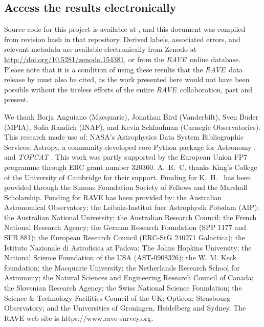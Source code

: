 \documentclass[preprint]{aastex}
\newcommand{\acronym}[1]{{\small{#1}}}
\newcommand{\project}[1]{\textsl{#1}}
\newcommand{\rave}{\project{\acronym{RAVE}}}
\begin{document}
\subsection*{Access the results electronically}

\noindent{}Source code for this project is available at \texttt{\giturl}\hspace{-0.5em},
and this document was compiled from revision hash \texttt{\githash} in that repository.
Derived labels, associated errors, and relevant metadata are available electronically
from Zenodo \citep{Zenodo} at \url{http://doi.org/10.5281/zenodo.154381}, or 
from the \rave\ online database. Please note that it is a 
condition of using these results that the \rave\ data release by \citet{Kunder_2016} 
must also be cited, as the work presented here would not have been possible without the 
tireless efforts of the entire \rave\ collaboration, past and present.


\acknowledgements
We thank 
	Borja Anguiano (Macquarie),
	Jonathan Bird (Vanderbilt),
	Sven Buder (MPIA), 
	Sofia Randich (INAF),
and
	Kevin Schlaufman (Carnegie Observatories).
This research made use of: 
  	NASA's Astrophysics Data System Bibliographic Services;
  	Astropy, a community-developed core Python package for Astronomy \citep{astropy};
and 
  	\project{TOPCAT} \citep{Taylor_2005}.
This work was partly supported by the European Union FP7 programme through ERC 
grant number 320360. A.~R.~C. thanks King's College of the University of Cambridge
for their support.  Funding for K.~H.~ has been provided through the Simons 
Foundation Society of Fellows and the Marshall Scholarship.
Funding for RAVE has been provided by: the Australian Astronomical Observatory; 
the Leibniz-Institut fuer Astrophysik Potsdam (AIP); the Australian National 
University; the Australian Research Council; the French National Research Agency;
the German Research Foundation (SPP 1177 and SFB 881); the European Research 
Council (ERC-StG 240271 Galactica); the Istituto Nazionale di Astrofisica at 
Padova; The Johns Hopkins University; the National Science Foundation of the USA
(AST-0908326); the W. M. Keck foundation; the Macquarie University; the 
Netherlands Research School for Astronomy; the Natural Sciences and Engineering 
Research Council of Canada; the Slovenian Research Agency; the Swiss National 
Science Foundation; the Science \& Technology Facilities Council of the UK; 
Opticon; Strasbourg Observatory; and the Universities of Groningen, Heidelberg 
and Sydney. The RAVE web site is https://www.rave-survey.org.  
\end{document}
